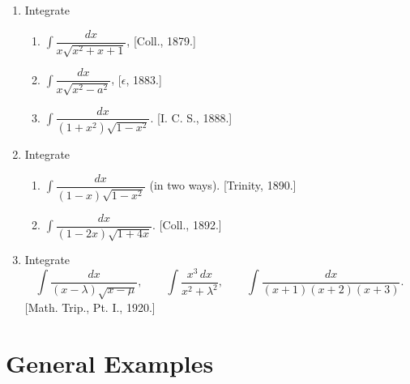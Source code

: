 \documentclass[11pt, a4paper]{article}
\newcommand{\source}[1]{\hfill\textnormal{[#1]}}
\begin{document}
\begin{enumerate}[leftmargin=2em]
\item Integrate
\begin{enumerate}[label=(\roman*)]
\item $\displaystyle\int \dfrac{dx}{x\sqrt{x^2+x+1}}$, \source{Coll., 1879.}
\item $\displaystyle\int \dfrac{dx}{x\sqrt{x^2-a^2}}$, \source{$\epsilon$, 1883.}
\item $\displaystyle\int \dfrac{dx}{(1+x^2)\sqrt{1-x^2}}$. \source{I. C. S., 1888.}
\end{enumerate}

\item Integrate
\begin{enumerate}[label=(\roman*)]
\item $\displaystyle\int \dfrac{dx}{(1-x)\sqrt{1-x^2}}$ (in two ways). \source{Trinity, 1890.}
\item $\displaystyle\int \dfrac{dx}{(1-2x)\sqrt{1+4x}}$. \source{Coll., 1892.}
\end{enumerate}

\item Integrate
\[
\int \dfrac{dx}{(x-\lambda)\sqrt{x-\mu}}, \qquad \int \dfrac{x^3\,dx}{x^2+\lambda^2}, \qquad \int \dfrac{dx}{(x+1)(x+2)(x+3)}.
\]
\source{Math. Trip., Pt. I., 1920.}

\end{enumerate}

\section*{General Examples}
\end{document}
